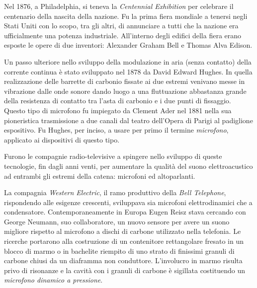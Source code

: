 \begin{refsection}
Nel 1876, a Philadelphia, si teneva la \emph{Centennial Exhibition} per celebrare
il centenario della nascita della nazione. Fu la prima fiera mondiale a tenersi
negli Stati Uniti con lo scopo, tra gli altri, di annunciare a tutti che la nazione era
ufficialmente una potenza industriale. All'interno degli edifici della fiera erano
esposte le opere di due inventori: Alexander Graham Bell e Thomas Alva Edison.

Un passo ulteriore nello sviluppo della modulazione in aria (senza contatto) della
corrente continua è stato sviluppato nel 1878 da David Edward Hughes. In quella
realizzazione delle barrette di carbonio fissate ai due estremi venivano messe in
vibrazione dalle onde sonore dando luogo a una fluttuazione abbastanza grande
della resistenza
di contatto tra l'asta di carbonio e i due punti di fissaggio. Questo tipo di
microfono fu impiegato da Clement Ader nel 1881 nella sua pioneristica trasmissione a due
canali dal teatro dell'Opera di Parigi al padiglione espositivo.
Fu Hughes, per inciso, a usare per primo il termine \emph{microfono}, applicato
ai dispositivi di questo tipo.

Furono le compagnie radio-televisive a spingere nello sviluppo di queste tecnologie,
fin dagli anni venti, per aumentare la qualità del suono elettroacustico ad
entrambi gli estremi della catena: microfoni ed altoparlanti.

La compagnia \emph{Western Electric}, il ramo produttivo della \emph{Bell Telephone},
rispondendo alle esigenze crescenti, sviluppava sia microfoni elettrodinamici che
a condensatore. Contemporaneamente in Europa Eugen Reisz stava cercando con George Neumann,
suo collaboratore, un nuovo sensore per avere un suono migliore rispetto al
microfono a dischi di carbone utilizzato nella telefonia. Le ricerche portarono alla
costruzione di un contenitore rettangolare fresato in un blocco di marmo o in
bachelite riempito di uno strato di finissimi granuli di carbone chiusi da un
diaframma non conduttore. L’involucro in marmo risulta privo di risonanze e la
cavità con i granuli di carbone è sigillata costituendo un \emph{microfono dinamico a pressione}.


\end{refsection}
